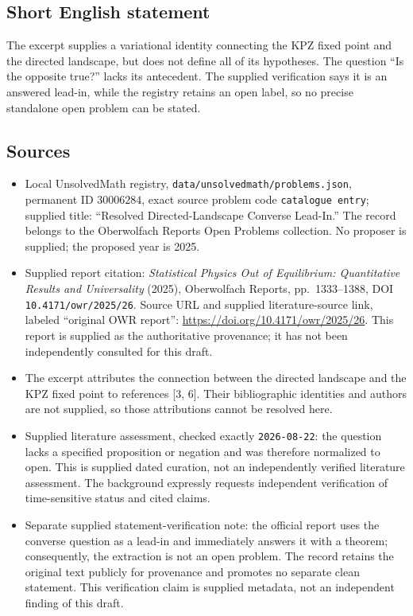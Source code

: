 \documentclass[11pt]{article}
\begin{document}
\subsection{Short English statement}
The excerpt supplies a variational identity connecting the KPZ fixed point and the directed landscape, but does not define all of its hypotheses. The question ``Is the opposite true?'' lacks its antecedent. The supplied verification says it is an answered lead-in, while the registry retains an open label, so no precise standalone open problem can be stated.
\subsection{Sources}
\begin{itemize}
\item Local UnsolvedMath registry, \texttt{data/unsolvedmath/problems.json}, permanent ID \(30006284\), exact source problem code \texttt{catalogue entry}; supplied title: ``Resolved Directed-Landscape Converse Lead-In.'' The record belongs to the Oberwolfach Reports Open Problems collection. No proposer is supplied; the proposed year is 2025.
\item Supplied report citation: \emph{Statistical Physics Out of Equilibrium: Quantitative Results and Universality} (2025), Oberwolfach Reports, pp.\ 1333--1388, DOI \texttt{10.4171/owr/2025/26}. Source URL and supplied literature-source link, labeled ``original OWR report'': \url{https://doi.org/10.4171/owr/2025/26}. This report is supplied as the authoritative provenance; it has not been independently consulted for this draft.
\item The excerpt attributes the connection between the directed landscape and the KPZ fixed point to references [3, 6]. Their bibliographic identities and authors are not supplied, so those attributions cannot be resolved here.
\item Supplied literature assessment, checked exactly \texttt{2026-08-22}: the question lacks a specified proposition or negation and was therefore normalized to open. This is supplied dated curation, not an independently verified literature assessment. The background expressly requests independent verification of time-sensitive status and cited claims.
\item Separate supplied statement-verification note: the official report uses the converse question as a lead-in and immediately answers it with a theorem; consequently, the extraction is not an open problem. The record retains the original text publicly for provenance and promotes no separate clean statement. This verification claim is supplied metadata, not an independent finding of this draft.
\end{itemize}
\end{document}
